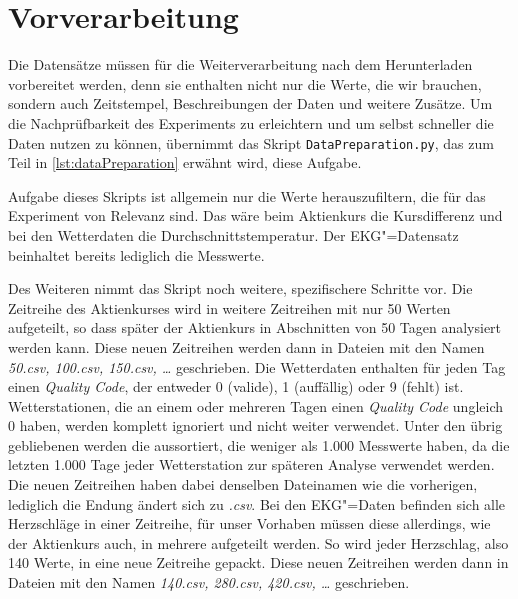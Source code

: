 \section{Vorverarbeitung}
Die Datensätze müssen für die Weiterverarbeitung nach dem Herunterladen vorbereitet werden, denn sie enthalten nicht nur die Werte, die wir brauchen, sondern auch Zeitstempel, Beschreibungen der Daten und weitere Zusätze. Um die Nachprüfbarkeit des Experiments zu erleichtern und um selbst schneller die Daten nutzen zu können, übernimmt das Skript \lstinline|DataPreparation.py|, das zum Teil in \autoref{lst:dataPreparation} erwähnt wird, diese Aufgabe.

Aufgabe dieses Skripts ist allgemein nur die Werte herauszufiltern, die für das Experiment von Relevanz sind. Das wäre beim Aktienkurs die Kursdifferenz und bei den Wetterdaten die Durchschnittstemperatur. Der EKG"=Datensatz beinhaltet bereits lediglich die Messwerte. 

Des Weiteren nimmt das Skript noch weitere, spezifischere Schritte vor. Die Zeitreihe des Aktienkurses wird in weitere Zeitreihen mit nur 50 Werten aufgeteilt, so dass später der Aktienkurs in Abschnitten von 50 Tagen analysiert werden kann. Diese neuen Zeitreihen werden dann in Dateien mit den Namen \textit{50.csv, 100.csv, 150.csv, \dots} geschrieben. Die Wetterdaten enthalten für jeden Tag einen \textit{Quality Code}, der entweder 0 (valide), 1 (auffällig) oder 9 (fehlt) ist. Wetterstationen, die an einem oder mehreren Tagen einen \textit{Quality Code} ungleich 0 haben, werden komplett ignoriert und nicht weiter verwendet. Unter den übrig gebliebenen werden die aussortiert, die weniger als 1.000 Messwerte haben, da die letzten 1.000 Tage jeder Wetterstation zur späteren Analyse verwendet werden. Die neuen Zeitreihen haben dabei denselben Dateinamen wie die vorherigen, lediglich die Endung ändert sich zu \textit{.csv}. Bei den EKG"=Daten befinden sich alle Herzschläge in einer Zeitreihe, für unser Vorhaben müssen diese allerdings, wie der Aktienkurs auch, in mehrere aufgeteilt werden. So wird jeder Herzschlag, also 140 Werte, in eine neue Zeitreihe gepackt. Diese neuen Zeitreihen werden dann in Dateien mit den Namen \textit{140.csv, 280.csv, 420.csv, \dots} geschrieben.